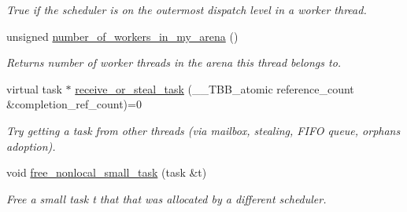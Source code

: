 \begin{DoxyCompactItemize}
\begin{DoxyCompactList}\small\item\em True if the scheduler is on the outermost dispatch level in a worker thread. \end{DoxyCompactList}\item 
\hypertarget{classtbb_1_1internal_1_1generic__scheduler_ad75b9adc115cb49cde7aa4878a186d0a}{}unsigned \hyperlink{classtbb_1_1internal_1_1generic__scheduler_ad75b9adc115cb49cde7aa4878a186d0a}{number\+\_\+of\+\_\+workers\+\_\+in\+\_\+my\+\_\+arena} ()\label{classtbb_1_1internal_1_1generic__scheduler_ad75b9adc115cb49cde7aa4878a186d0a}

\begin{DoxyCompactList}\small\item\em Returns number of worker threads in the arena this thread belongs to. \end{DoxyCompactList}\item 
virtual task $\ast$ \hyperlink{classtbb_1_1internal_1_1generic__scheduler_a11895552b22a769d2cd40b9e7c090d9b}{receive\+\_\+or\+\_\+steal\+\_\+task} (\+\_\+\+\_\+\+T\+B\+B\+\_\+atomic reference\+\_\+count \&completion\+\_\+ref\+\_\+count)=0
\begin{DoxyCompactList}\small\item\em Try getting a task from other threads (via mailbox, stealing, F\+I\+F\+O queue, orphans adoption). \end{DoxyCompactList}\item 
\hypertarget{classtbb_1_1internal_1_1generic__scheduler_a720c816c0253fe199e4583cd24090e9b}{}void \hyperlink{classtbb_1_1internal_1_1generic__scheduler_a720c816c0253fe199e4583cd24090e9b}{free\+\_\+nonlocal\+\_\+small\+\_\+task} (task \&t)\label{classtbb_1_1internal_1_1generic__scheduler_a720c816c0253fe199e4583cd24090e9b}

\begin{DoxyCompactList}\small\item\em Free a small task t that that was allocated by a different scheduler. \end{DoxyCompactList}\end{DoxyCompactItemize}
